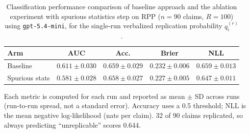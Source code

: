 \begin{table}[ht]
  \centering
  \small
  \caption{Classification performance comparison of baseline approach and the ablation experiment with spurious
    statistics step on RPP ($n=90$ claims, $R=100$) using \texttt{gpt-5.4-mini}, for the single-run verbalized
    replication probability $q_i^{(r)}$.}
  \label{tab:classification_gpt_spurious}
  \begin{tabular}{@{}lcccc@{}}
    \toprule
    Arm & AUC & Acc. & Brier & NLL\\
    \midrule
    Baseline       & $0.611 \pm 0.030$ & $0.659 \pm 0.029$ & $0.232 \pm 0.006$ & $0.659 \pm 0.013$\\
    Spurious stats & $0.581 \pm 0.028$ & $0.658 \pm 0.027$ & $0.227 \pm 0.005$ & $0.647 \pm 0.011$\\
    \bottomrule
  \end{tabular}

  \smallskip
  \parbox{\linewidth}{\footnotesize
    Each metric is computed for each run and reported as mean $\pm$ SD across runs (run-to-run spread, not a standard
    error). Accuracy uses a 0.5 threshold; NLL is the mean negative log-likelihood (nats per claim). 32 of 90 claims replicated, so always predicting ``unreplicable'' scores 0.644.}
\end{table}
